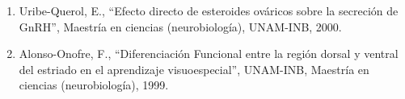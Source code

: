 \begin{enumerate}
\item Uribe-Querol, E., “Efecto directo de esteroides ováricos sobre la secreción de GnRH”, Maestría en ciencias 
(neurobiología), UNAM-INB, 2000.

\item Alonso-Onofre, F., “Diferenciación Funcional entre la región dorsal y ventral del estriado en el aprendizaje 
visuoespecial”, UNAM-INB, Maestría en ciencias (neurobiología), 1999.

\end{enumerate}

